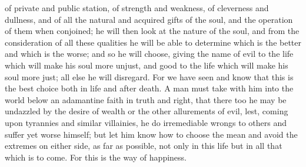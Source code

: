 of private and public station, of strength and weakness, of cleverness
and dullness, and of all the natural and acquired gifts of the soul, and
the operation of them when conjoined; he will then look at the nature of
the soul, and from the consideration of all these qualities he will be
able to determine which is the better and which is the worse; and so
he will choose, giving the name of evil to the life which will make his
soul more unjust, and good to the life which will make his soul more
just; all else he will disregard. For we have seen and know that this is
the best choice both in life and after death. A man must take with him
into the world below an adamantine faith in truth and right, that there
too he may be undazzled by the desire of wealth or the other allurements
of evil, lest, coming upon tyrannies and similar villainies, he do
irremediable wrongs to others and suffer yet worse himself; but let him
know how to choose the mean and avoid the extremes on either side, as
far as possible, not only in this life but in all that which is to come.
For this is the way of happiness.

